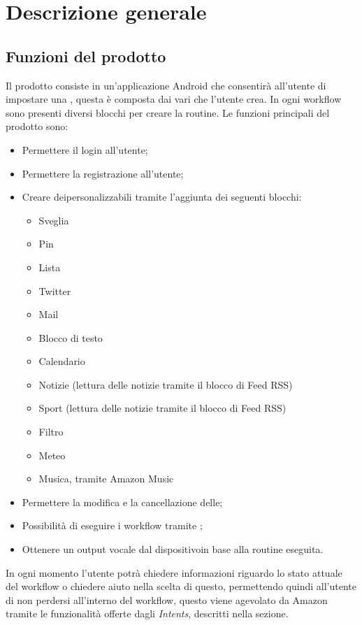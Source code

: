 \chapter{Descrizione generale} \label{DescrizioneGenerale}

\section{Funzioni del prodotto}
Il prodotto consiste in un'applicazione Android che consentirà all'utente di impostare una , questa è composta dai vari  che l'utente crea. In ogni workflow sono presenti diversi blocchi per creare la routine. Le funzioni principali del prodotto sono:
\begin{itemize}
	\item Permettere il login all'utente;
	\item Permettere la registrazione all'utente;
	\item Creare deipersonalizzabili tramite l'aggiunta dei seguenti blocchi:
	\begin{itemize}
		\item Sveglia
		\item Pin
		\item Lista
		\item Twitter
		\item Mail
		\item Blocco di testo
		\item Calendario
		\item Notizie (lettura delle notizie tramite il blocco di Feed RSS)
		\item Sport (lettura delle notizie tramite il blocco di Feed RSS)
		\item Filtro
		\item Meteo
		\item Musica, tramite Amazon Music 
	\end{itemize}
	\item Permettere la modifica e la cancellazione delle;
	\item Possibilità di eseguire i workflow tramite ;
	\item Ottenere un output vocale dal dispositivoin base alla routine eseguita.
\end{itemize}
In ogni momento l'utente potrà chiedere informazioni riguardo lo stato attuale del workflow o chiedere aiuto nella scelta di questo, permettendo quindi all'utente di non perdersi all'interno del workflow, questo viene agevolato da Amazon tramite le funzionalità offerte dagli \textit{Intents}, descritti nella sezione.

